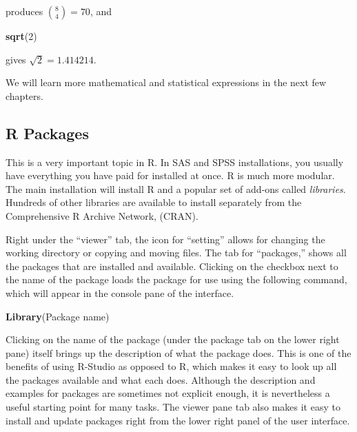 \documentclass[]{book}
\newenvironment{Shaded}{\begin{snugshade}}{\end{snugshade}}
\newcommand{\KeywordTok}[1]{\textcolor[rgb]{0.13,0.29,0.53}{\textbf{#1}}}
\newcommand{\DecValTok}[1]{\textcolor[rgb]{0.00,0.00,0.81}{#1}}
\newcommand{\NormalTok}[1]{#1}
\begin{document}
produces \(\binom{8}{4}=70\), and

\begin{Shaded}
\begin{Highlighting}[]
\KeywordTok{sqrt}\NormalTok{(}\DecValTok{2}\NormalTok{)}
\end{Highlighting}
\end{Shaded}

gives \(\sqrt{2}=1.414214\).

We will learn more mathematical and statistical expressions in the next
few chapters.

\subsection{R Packages}\label{r-packages}

This is a very important topic in R. In SAS and SPSS installations, you
usually have everything you have paid for installed at once. R is much
more modular. The main installation will install R and a popular set of
add‐ons called \emph{libraries}. Hundreds of other libraries are
available to install separately from the Comprehensive R Archive
Network, (CRAN).

Right under the ``viewer'' tab, the icon for ``setting'' allows for
changing the working directory or copying and moving files. The tab for
``packages,'' shows all the packages that are installed and available.
Clicking on the checkbox next to the name of the package loads the
package for use using the following command, which will appear in the
console pane of the interface.

\begin{Shaded}
\begin{Highlighting}[]
\KeywordTok{Library}\NormalTok{(Package name)}
\end{Highlighting}
\end{Shaded}

Clicking on the name of the package (under the package tab on the lower
right pane) itself brings up the description of what the package does.
This is one of the benefits of using R-Studio as opposed to R, which
makes it easy to look up all the packages available and what each does.
Although the description and examples for packages are sometimes not
explicit enough, it is nevertheless a useful starting point for many
tasks. The viewer pane tab also makes it easy to install and update
packages right from the lower right panel of the user interface.
\end{document}
